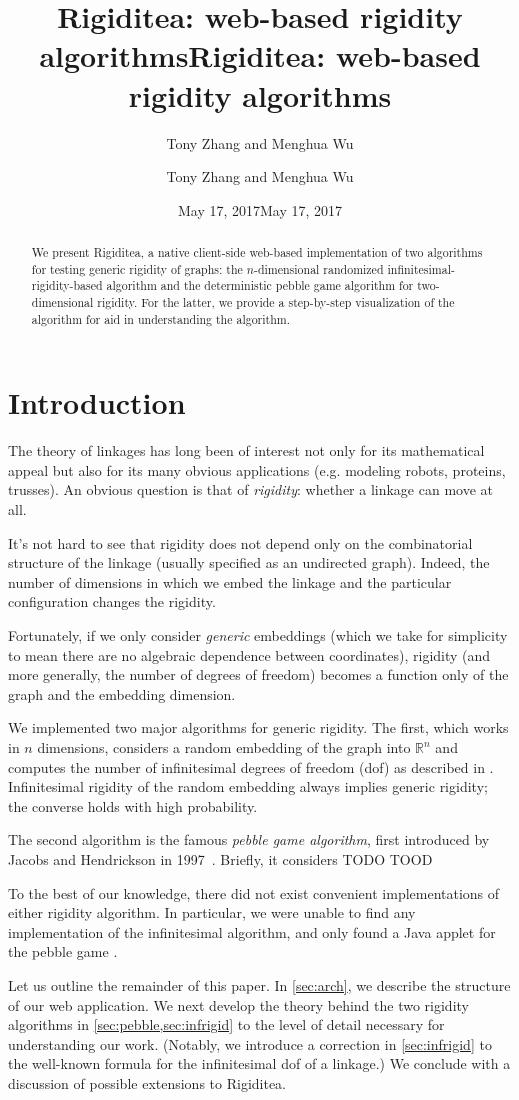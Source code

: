 \documentclass[aps,prd,final,twocolumn,letterpaper,nofootinbib]{revtex4-1}
\title{Rigiditea: web-based rigidity algorithms}
\author{Tony Zhang and Menghua Wu}
\date{May 17, 2017}
\newcommand\RR{\mathbb{R}}
\newcommand\headers{
    \title{Rigiditea: web-based rigidity algorithms}
    \author{Tony Zhang and Menghua Wu}
    \date{May 17, 2017}    
    \begin{abstract}
        We present Rigiditea,
        a native client-side web-based implementation of two algorithms
        for testing generic rigidity of graphs:
        the $n$-dimensional randomized infinitesimal-rigidity-based algorithm
        and the deterministic pebble game algorithm for two-dimensional rigidity.
        For the latter, we provide a step-by-step visualization of the algorithm
        for aid in understanding the algorithm.
    \end{abstract}
}
\begin{document}
\ifrevtex\headers\fi

\maketitle




\tableofcontents

\section{Introduction}

The theory of linkages has long been of interest
not only for its mathematical appeal
but also for its many obvious applications
(e.g. modeling robots, proteins, trusses).
An obvious question is that of \emph{rigidity}:
whether a linkage can move at all.

It's not hard to see that rigidity does not depend
only on the combinatorial structure of the linkage
(usually specified as an undirected graph).
Indeed, the number of dimensions in which we embed the linkage
and the particular configuration changes the rigidity.

Fortunately, if we only consider \emph{generic} embeddings
(which we take for simplicity to mean
there are no algebraic dependence between coordinates),
rigidity (and more generally, the number of degrees of freedom)
becomes a function only of the graph and the embedding dimension.

We implemented two major algorithms for generic rigidity.
The first, which works in $n$ dimensions,
considers a random embedding of the graph into $\RR^n$
and computes the number of infinitesimal degrees of freedom (dof)
as described in \cite[\S4.4.2]{gfalop}.
Infinitesimal rigidity of the random embedding always implies generic rigidity;
the converse holds with high probability.

The second algorithm is the famous \emph{pebble game algorithm},
first introduced by Jacobs and Hendrickson in 1997~\cite{jacobs97}.
Briefly, it considers TODO TOOD

To the best of our knowledge,
there did not exist convenient implementations of
either rigidity algorithm.
In particular,
we were unable to find any implementation of the infinitesimal algorithm,
and only found a Java applet for the pebble game \cite{stjohnapplet}.

Let us outline the remainder of this paper.
In \cref{sec:arch}, we describe the structure of our web application.
We next develop the theory behind the two rigidity algorithms
in \cref{sec:pebble,sec:infrigid}
to the level of detail necessary for understanding our work.
(Notably, we introduce a correction in \cref{sec:infrigid}
to the well-known formula for the infinitesimal dof of a linkage.)
We conclude with a discussion of possible extensions to Rigiditea.
\end{document}
